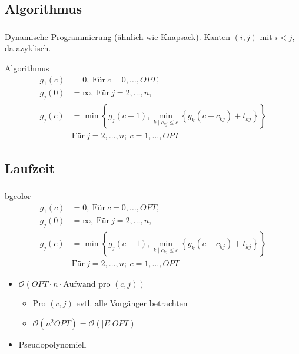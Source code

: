 \documentclass{beamer}
\begin{document}
\subsection{Algorithmus}
\begin{frame}
   \frametitle{\insertsection}
   \framesubtitle{\insertsubsection}

   Dynamische Programmierung (ähnlich wie Knapsack). Kanten $(i,j)$ mit $i < j$,
   da azyklisch.
   \begin{block}{Algorithmus}
      \begin{align*}
         g_1(c) & =  0, ~ \text{Für} ~ c = 0,\ldots,OPT, \\
         g_j(0) & =  \infty, ~ \text{Für} ~ j = 2,\ldots,n, \\
         g_j(c) & =  \min\left\{g_j(c-1), \min_{k \mid c_{kj} \le
   c}\left\{g_k(c-c_{kj}) + t_{kj}\right\}\right\} \\
   & \text{Für} ~ j = 2,\ldots,n; ~ c= 1,\ldots,OPT
\end{align*}
   \end{block}
\end{frame}

\subsection{Laufzeit}

\begin{frame}
   \frametitle{\insertsection}
   \framesubtitle{\insertsubsection}
   \begin{beamercolorbox}[center,wd=\paperwidth]{bgcolor}
      \begin{align*}
         g_1(c) & =  0, ~ \text{Für} ~ c = 0,\ldots,OPT, \\
         g_j(0) & =  \infty, ~ \text{Für} ~ j = 2,\ldots,n, \\
         g_j(c) & =  \min\left\{g_j(c-1), \min_{k \mid c_{kj} \le
   c}\left\{g_k(c-c_{kj}) + t_{kj}\right\}\right\} \\
   & \text{Für} ~ j = 2,\ldots,n; ~ c= 1,\ldots,OPT
\end{align*}
   \end{beamercolorbox}

   \begin{itemize}
      \item $\mathcal{O}(OPT\cdot n \cdot \text{Aufwand pro $(c,j)$})$
         \begin{itemize}
            \item Pro $(c,j)$ evtl. alle Vorgänger betrachten
            \item $\mathcal{O}\left(n^2 OPT\right) = \mathcal{O}\left(|E| OPT\right)$
         \end{itemize}
      \item Pseudopolynomiell
   \end{itemize}

\end{frame}
\end{document}

